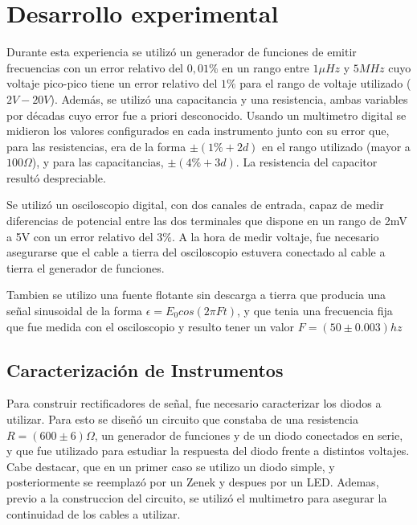 \documentclass[11pt,a4paper]{article}
\begin{document}
\section{Desarrollo experimental}

Durante esta experiencia se utilizó un generador de funciones de emitir frecuencias con un error relativo del $0,01\%$ en un rango entre $1\mu Hz$ y $5MHz$ cuyo voltaje pico-pico tiene un error relativo del $1\%$ para el rango de voltaje utilizado ($2V-20V$). Además, se utilizó una capacitancia y una resistencia, ambas variables por décadas cuyo error fue a priori desconocido. Usando un multimetro digital se midieron los valores configurados en cada instrumento junto con su error que, para las resistencias, era de la forma $\pm(1\%+2d)$ en el rango utilizado (mayor a $100\Omega$), y para las  capacitancias, $\pm(4\%+3d)$. La resistencia del capacitor resultó despreciable.

Se utilizó un osciloscopio digital, con dos canales de entrada, capaz de medir diferencias de potencial entre las dos terminales que dispone en un rango de 2mV a 5V con un error relativo del $3\%$. A la hora de medir voltaje, fue necesario asegurarse que el cable a tierra del osciloscopio estuvera conectado al cable a tierra el generador de funciones. 

Tambien se utilizo una fuente flotante sin descarga a tierra que producia una señal sinusoidal de la forma $\epsilon = E_{0}cos(2\pi Ft)$, y que tenia una frecuencia fija que fue medida con el osciloscopio y resulto tener un valor $F = (50 \pm 0.003)hz$


\subsection{Caracterización de Instrumentos}
Para construir rectificadores de señal, fue necesario caracterizar los diodos a utilizar. Para esto se diseñó un circuito que constaba de una resistencia \textbf{$R = (600 \pm 6)\Omega$}, un generador de funciones y de un diodo conectados en serie, y que fue utilizado para estudiar la respuesta del diodo frente a distintos voltajes. Cabe destacar, que en un primer caso se utilizo un diodo simple, y posteriormente se reemplazó por un Zenek y despues por un LED. Ademas, previo a la construccion del circuito, se utilizó el multimetro para asegurar la continuidad de los cables a utilizar.
\end{document}
